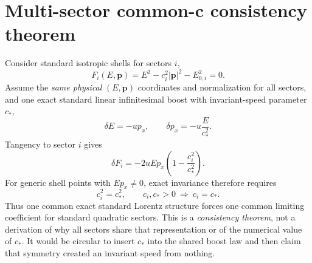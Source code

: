 \documentclass[11pt,a4paper]{article}
\begin{document}
\section{Multi-sector common-c consistency theorem}
\label{sec:common-c-v090}
Consider standard isotropic shells for sectors $i$,
\begin{equation}
 F_i(E,\mathbf p)=E^2-c_i^2|\mathbf p|^2-E_{0,i}^2=0.
\end{equation}
Assume the \emph{same physical} $(E,\mathbf p)$ coordinates and normalization for all sectors, and one exact standard linear infinitesimal boost with invariant-speed parameter $c_*$,
\begin{equation}
 \delta E=-u p_x,\qquad \delta p_x=-u\frac{E}{c_*^2}.
\end{equation}
Tangency to sector $i$ gives
\begin{equation}
 \delta F_i=-2uEp_x\left(1-\frac{c_i^2}{c_*^2}\right).
\end{equation}
For generic shell points with $Ep_x\neq0$, exact invariance therefore requires
\begin{equation}
 \boxed{c_i^2=c_*^2,\qquad c_i,c_*>0\ \Longrightarrow\ c_i=c_*.}
 \label{eq:common-c-v090}
\end{equation}
Thus one common exact standard Lorentz structure forces one common limiting coefficient for standard quadratic sectors.  This is a \emph{consistency theorem}, not a derivation of why all sectors share that representation or of the numerical value of $c_*$.  It would be circular to insert $c_*$ into the shared boost law and then claim that symmetry created an invariant speed from nothing.
\end{document}
